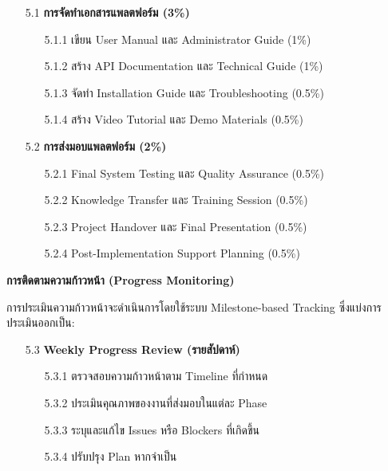 \documentclass[12pt,a4paper]{article}
\begin{document}
\begin{enumerate}[leftmargin=2cm]
{        \begin{enumerate}
            \item[5.1] \textbf{การจัดทำเอกสารแพลตฟอร์ม (3\%)}
            \begin{enumerate}
                \item[5.1.1] เขียน User Manual และ Administrator Guide (1\%)
                \item[5.1.2] สร้าง API Documentation และ Technical Guide (1\%)
                \item[5.1.3] จัดทำ Installation Guide และ Troubleshooting (0.5\%)
                \item[5.1.4] สร้าง Video Tutorial และ Demo Materials (0.5\%)
            \end{enumerate}
            
            \item[5.2] \textbf{การส่งมอบแพลตฟอร์ม (2\%)}
            \begin{enumerate}
                \item[5.2.1] Final System Testing และ Quality Assurance (0.5\%)
                \item[5.2.2] Knowledge Transfer และ Training Session (0.5\%)
                \item[5.2.3] Project Handover และ Final Presentation (0.5\%)
                \item[5.2.4] Post-Implementation Support Planning (0.5\%)
            \end{enumerate}
        \end{enumerate}

        \vspace{0.5cm}

        \textbf{การติดตามความก้าวหน้า (Progress Monitoring)}

        \hspace{1cm}การประเมินความก้าวหน้าจะดำเนินการโดยใช้ระบบ Milestone-based Tracking ซึ่งแบ่งการประเมินออกเป็น:

        \begin{enumerate}
            \item[5.3] \textbf{Weekly Progress Review (รายสัปดาห์)}
            \begin{enumerate}
                \item[5.3.1] ตรวจสอบความก้าวหน้าตาม Timeline ที่กำหนด
                \item[5.3.2] ประเมินคุณภาพของงานที่ส่งมอบในแต่ละ Phase
                \item[5.3.3] ระบุและแก้ไข Issues หรือ Blockers ที่เกิดขึ้น
                \item[5.3.4] ปรับปรุง Plan หากจำเป็น
            \end{enumerate}
            

\end{enumerate}}
\end{enumerate}
\end{document}
